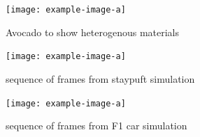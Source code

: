 \begin{figure}
  \texttt{[image: example-image-a]}
  \caption{Avocado to show heterogenous materials}
  \label{fig:avocado}
\end{figure}

\begin{figure}[htp]
  \texttt{[image: example-image-a]}
  \caption{sequence of frames from staypuft simulation}
  \label{fig:staypuft}
\end{figure}

\begin{figure}[htp]
  \texttt{[image: example-image-a]}
  \caption{sequence of frames from F1 car simulation}
  \label{fig:f1}
\end{figure}
